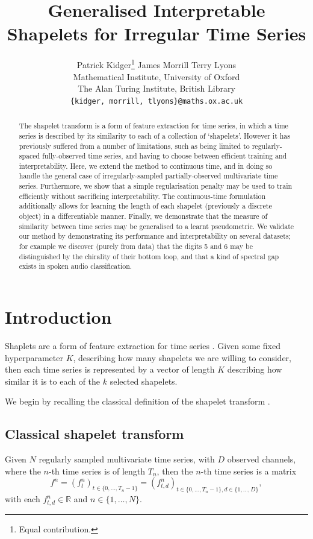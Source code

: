 \documentclass{article}
\title{Generalised Interpretable Shapelets for Irregular Time Series}
\author{ 
	Patrick Kidger\thanks{Equal contribution.}
	\And
	James Morrill\footnotemark[1]
	\And
	Terry Lyons
	\AND \\[-12pt]
	Mathematical Institute, University of Oxford \\
	The Alan Turing Institute, British Library \\
	\texttt{\{kidger, morrill, tlyons\}@\hspace{0.8pt}maths.ox.ac.uk}
}
\theoremstyle{plain}
\theoremstyle{definition}
\newcommand{\reals}{\mathbb{R}}
\begin{document}
	\maketitle
	\begin{abstract}
		The shapelet transform is a form of feature extraction for time series, in which a time series is described by its similarity to each of a collection of `shapelets'. However it has previously suffered from a number of limitations, such as being limited to regularly-spaced fully-observed time series, and having to choose between efficient training and interpretability. Here, we extend the method to continuous time, and in doing so handle the general case of irregularly-sampled partially-observed multivariate time series.  Furthermore, we show that a simple regularisation penalty may be used to train efficiently without sacrificing interpretability. The continuous-time formulation additionally allows for learning the length of each shapelet (previously a discrete object) in a differentiable manner. Finally, we demonstrate that the measure of similarity between time series may be generalised to a learnt pseudometric. We validate our method by demonstrating its performance and interpretability on several datasets; for example we discover (purely from data) that the digits 5 and 6 may be distinguished by the chirality of their bottom loop, and that a kind of spectral gap exists in spoken audio classification.
	\end{abstract}
	\section{Introduction}
	Shaplets are a form of feature extraction for time series \cite{ye2009firstshapelet, grabocka2014learningshapelet, hou2016efficient, bagnall2016bakeoff, michaelshapelet}. Given some fixed hyperparameter $K$, describing how many shapelets we are willing to consider, then each time series is represented by a vector of length $K$ describing how similar it is to each of the $k$ selected shapelets.
	
	We begin by recalling the classical definition of the shapelet transform \cite{hills2014classification}.
	\subsection{Classical shapelet transform}\label{section:classical-introduction}
	Given $N$ regularly sampled multivariate time series, with $D$ observed channels, where the $n$-th time series is of length $T_n$, then the $n$-th time series is a matrix 
	\begin{equation}\label{eq:f-n}
	f^n = (f^n_{t})_{t \in \{0, \ldots, T_n - 1\}} = (f^n_{t, d})_{t \in \{0, \ldots, T_n - 1\}, d \in \{1, \ldots, D\}},
	\end{equation}
	with each $f^n_{t, d} \in \reals$ and $n \in \{1, \ldots, N\}$.%
	
\end{document}
